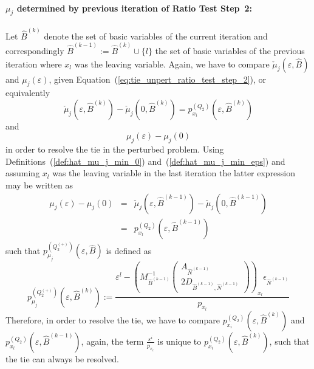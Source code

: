 \documentclass[a4paper]{article}
\newcommand{\pmu}[2]{\ensuremath{p_{\mu_{j}}^{(#1)}(\varepsilon, #2)}}
\begin{document}
\paragraph{$\mu_{j}$ determined by previous iteration of Ratio Test Step~2:}
Let $\hat{B}^{(k)}$ denote
the set of basic variables of the current iteration and correspondingly
$\hat{B}^{(k-1)}:=\hat{B}^{(k)} \cup \{l\}$ the set of basic variables of the
previous iteration where $x_{l}$ was the leaving variable.
Again, we have to compare $\check{\mu}_{j}(\varepsilon, \hat{B})$ and
$\mu_{j}(\varepsilon)$, given Equation~(\ref{eq:tie_unpert_ratio_test_step_2}),
or equivalently
\begin{equation*}
  \check{\mu}_{j}(\varepsilon, \hat{B}^{(k)}) -
  \check{\mu}_{j}(0, \hat{B}^{(k)})=
  p_{x_{i}}^{(Q_{2})}(\varepsilon, \hat{B}^{(k)})
\end{equation*}
and
\begin{equation*}
\mu_{j}\left(\varepsilon\right) - \mu_{j}\left(0\right)
\end{equation*}
in order to resolve the tie in the perturbed problem.
Using Definitions~(\ref{def:hat_mu_j_min_0}) and~(\ref{def:hat_mu_j_min_eps})
and assuming $x_{l}$ was the leaving variable in the last iteration the
latter expression may be written as
\begin{eqnarray}
\mu_{j}\left(\varepsilon\right) - \mu_{j}\left(0\right)
&=&
\check{\mu}_{j}(\varepsilon, \hat{B}^{(k-1)})
-\check{\mu}_{j}(0, \hat{B}^{(k-1)})
\nonumber \\
&=&
p_{x_{l}}^{(Q_{2})}(\varepsilon, \hat{B}^{(k-1)})
\nonumber
\end{eqnarray}
such that \pmu{Q_{2}^{(+)}}{\hat{B}} is defined as
\begin{equation}
\label{def:p_mu_j_Q_2_+}
\pmu{Q_{2}^{(+)}}{\hat{B}^{(k)}} :=
  \frac{\varepsilon^{l} -
         \left(M_{\hat{B}^{(k-1)}}^{-1}
           \left(\begin{array}{c}
                    A_{\hat{N}^{(k-1)}}  \\
	            \hline
	            2D_{\hat{B}^{(k-1)}, \hat{N}^{(k-1)}}
	         \end{array}
	   \right)
         \right)_{x_{l}}\epsilon_{\hat{N}^{(k-1)}}}{p_{x_{l}}}
\end{equation}
Therefore, in order to resolve the tie, we have to compare
$p_{x_{i}}^{(Q_{2})}(\varepsilon, \hat{B}^{(k)})$ and
$p_{x_{l}}^{(Q_{2})}(\varepsilon, \hat{B}^{(k-1)})$, again,
the term $\frac{\varepsilon^{i}}{p_{x_{i}}}$ is unique to
$p_{x_{i}}^{(Q_{2})}(\varepsilon, \hat{B}^{(k)})$, such that the tie can
always be resolved. 
\end{document}
